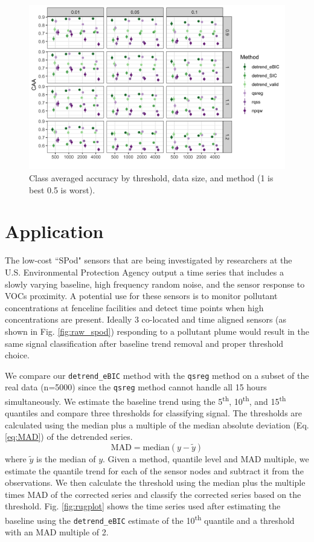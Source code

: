 \documentclass[12pt]{article}
\begin{document}
	\begin{figure}[h!]
		\caption{Class averaged accuracy by threshold, data size, and method (1 is best 0.5 is worst).}
		\includegraphics[width = \linewidth]{Figures/peaks_CAA.png}
	\end{figure}


	\FloatBarrier
	
	\section{Application}
	
	The low-cost ``SPod" sensors that are being investigated by researchers at the U.S. Environmental Protection Agency output a time series that includes a slowly varying baseline, high frequency random noise, and the sensor response to VOCs proximity. A potential use for these sensors is to monitor pollutant concentrations at fenceline facilities and detect time points when high concentrations are present. Ideally 3 co-located and time aligned sensors (as shown in Fig. \ref{fig:raw_spod}) responding to a pollutant plume would result in the same signal classification after baseline trend removal and proper threshold choice. 
	
	We compare our \texttt{detrend\_eBIC} method with the \texttt{qsreg} method on a subset of the real data (n=5000) since the \texttt{qsreg} method cannot handle all 15 hours simultaneously. We estimate the baseline trend using the 5\textsuperscript{th}, 10\textsuperscript{th}, and 15\textsuperscript{th} quantiles and compare three thresholds for classifying signal. The thresholds are calculated using the median plus a multiple of the median absolute deviation (Eq. \ref{eq:MAD}) of the detrended series. 
	\begin{equation}
	\label{eq:MAD}
	\mbox{MAD} = \mbox{median}(y-\tilde{y})
	\end{equation}
	where $\tilde{y}$ is the median of $y$. Given a method, quantile level and MAD multiple, we estimate the quantile trend for each of the sensor nodes and subtract it from the observations. We then calculate the threshold using the median plus the multiple times MAD of the corrected series and classify the corrected series based on the threshold. Fig. \ref{fig:rugplot} shows the time series used after estimating the baseline using the \texttt{detrend\_eBIC} estimate of the 10\textsuperscript{th} quantile and a threshold with an MAD multiple of 2. 
	 
\end{document}
